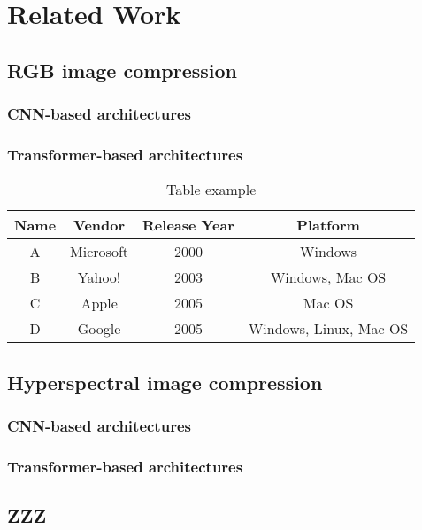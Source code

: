 \chapter{Related Work\label{cha:chapter2}}

\section{RGB image compression \label{sec:ch2xxx}}
\subsection{CNN-based architectures}
\subsection{Transformer-based architectures}

\begin{table}[h]
\caption{Table example}
\centering
\begin{tabular}[t]{|c|c|c|c|}
\hline
Name & Vendor & Release Year & Platform \\
\hline\hline
A & Microsoft & 2000 & Windows \\
\hline
B & Yahoo! & 2003 & Windows, Mac OS \\
\hline
C & Apple & 2005 & Mac OS \\
\hline
D & Google & 2005 & Windows, Linux, Mac OS \\
\hline
\end{tabular}
\label{tab:enghistory}
\end{table}

\section{Hyperspectral image compression \label{sec:ch2yyy}}
\subsection{CNN-based architectures}
\subsection{Transformer-based architectures}

\section{ZZZ \label{sec:ch2zzz}}